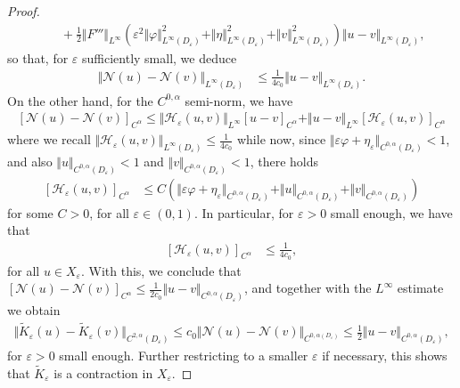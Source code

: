 \documentclass[11pt,reqno]{amsproc}
\newcommand{\N}{\mathcal{N}}
\newcommand{\ve}{\varepsilon}
\numberwithin{equation}{section}
\numberwithin{theorem}{section}
\numberwithin{prop}{section}
\numberwithin{cor}{section}
\numberwithin{lemma}{section}
\theoremstyle{remark}
\theoremstyle{definition}
\begin{document}
\begin{proof}
\begin{align*}
&\quad +\frac12 \Vert F'''\Vert_{L^\infty}\left( \ve^2 \Vert \varphi \Vert_{L^\infty(D_\ve)}^2 +  \Vert \eta \Vert_{L^\infty(D_\ve)}^2  + \Vert v \Vert_{L^\infty(D_\ve)}^2 \right) \Vert u - v \Vert_{L^\infty(D_\ve)},
\end{align*}
so that, for $\ve$ sufficiently small, we deduce
\begin{align*}
\Vert \N(u) - \N(v) \Vert_{L^\infty(D_\ve)}  &\leq \frac{1}{4c_0}\Vert u - v \Vert_{L^\infty(D_\ve)}.
\end{align*}
On the other hand, for the $C^{0,\alpha}$ semi-norm, we have
\begin{align*}
\left[ \N(u) - \N(v) \right]_{C^\alpha} \leq \Vert\mathcal{H}_\ve(u,v)\Vert_{L^\infty}\left[ u - v \right]_{C^\alpha} + \Vert u-v \Vert_{L^\infty} \left[ \mathcal{H}_\ve(u,v) \right]_{C^\alpha}
\end{align*}
where we recall $\Vert \mathcal{H}_\ve (u,v) \Vert_{L^\infty(D_\ve)}  \leq \frac{1}{4c_0}$ while now, since $\Vert \ve\varphi + \eta_\ve \Vert_{C^{0,\alpha}(D_\ve)}<1$, and also $\Vert u \Vert_{C^{0,\alpha}(D_\ve)}<1$ and $\Vert v \Vert_{C^{0,\alpha}(D_\ve)} < 1$, there holds
\begin{align*}
\left[ \mathcal{H}_\ve(u,v) \right]_{C^\alpha} &\leq C \left( \Vert \ve \varphi + \eta_\ve \Vert_{C^{0,\alpha}(D_\ve)} +  \Vert u \Vert_{C^{0,\alpha}(D_\ve)} + \Vert v \Vert_{C^{0,\alpha}(D_\ve)} \right) 
\end{align*}
for some $C>0$, for all $\ve\in (0,1)$. In particular, for $\ve>0$ small enough, we have that 
\begin{align*}
\left[ \mathcal{H}_\ve(u,v) \right]_{C^\alpha} &\leq \frac{1}{4c_0},
\end{align*} 
for all $u\in X_\ve$. With this, we conclude that $\left[ \N(u) - \N(v) \right]_{C^\alpha} \leq \frac{1}{2c_0}\Vert u - v \Vert_{C^{0,\alpha}(D_\ve)}$, and together with the $L^\infty$ estimate we obtain 
\begin{align*}
 \Vert \widetilde{K}_\ve(u) - \widetilde{K}_\ve(v) \Vert_{C^{2,\alpha}(D_\ve)} \leq c_0 \Vert \N(u) - \N(v) \Vert_{C^{0,\alpha(D_\ve)}} \leq \frac12\Vert u - v \Vert_{C^{0,\alpha}(D_\ve)},
\end{align*}
for $\ve>0$ small enough. Further restricting to a smaller $\ve$ if necessary, this shows that $\widetilde{K}_\ve$ is a contraction in $X_\ve$.
\end{proof}
\end{document}
